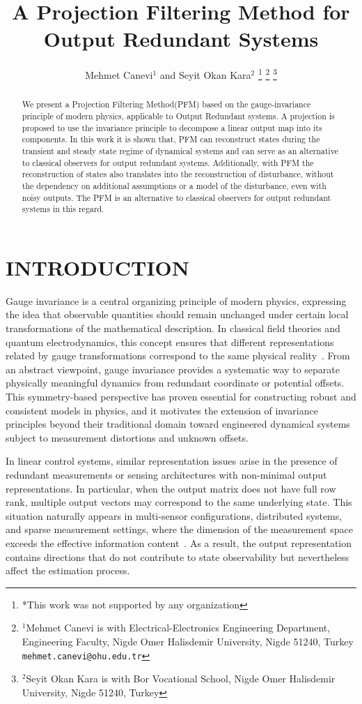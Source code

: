 \documentclass[letterpaper, 10 pt, conference]{ieeeconf}  %
\title{\LARGE \bf
A Projection Filtering Method for Output Redundant Systems
}
\author{Mehmet Canevi$^{1}$ and Seyit Okan Kara$^{2}$%
\thanks{*This work was not supported by any organization}%
\thanks{$^{1}$Mehmet Canevi is with Electrical-Electronics Engineering Department, Engineering Faculty, Nigde Omer Halisdemir University, Nigde 51240, Turkey
        {\tt\small mehmet.canevi@ohu.edu.tr}}%
\thanks{$^{2}$Seyit Okan Kara is with Bor Vocational School, Nigde Omer Halisdemir University, Nigde 51240, Turkey
        }%
}
\begin{document}
\maketitle
\thispagestyle{empty}
\pagestyle{empty}


\begin{abstract}

We present a Projection Filtering Method(PFM) based on the gauge-invariance principle of modern physics, applicable to Output Redundant systems. A projection is proposed to use the invariance principle to decompose a linear output map into its components. In this work it is shown that, PFM can reconstruct states during the transient and steady state regime of dynamical systems and can serve as an alternative to classical observers for output redundant systems. Additionally, with PFM the reconstruction of states also translates into the reconstruction of disturbance, without the dependency on additional assumptions or a model of the disturbance, even with noisy outputs. The PFM is an alternative to classical observers for output redundant systems in this regard.

\end{abstract}


\section{INTRODUCTION}

Gauge invariance is a central organizing principle of modern physics, expressing the idea that observable quantities should remain unchanged under certain local transformations of the mathematical description. In classical field theories and quantum electrodynamics, this concept ensures that different representations related by gauge transformations correspond to the same physical reality~\cite{Peskin1995,YangMills1954}. From an abstract viewpoint, gauge invariance provides a systematic way to separate physically meaningful dynamics from redundant coordinate or potential offsets. This symmetry-based perspective has proven essential for constructing robust and consistent models in physics, and it motivates the extension of invariance principles beyond their traditional domain toward engineered dynamical systems subject to measurement distortions and unknown offsets.

In linear control systems, similar representation issues arise in the presence of redundant measurements or sensing architectures with non-minimal output representations. In particular, when the output matrix does not have full row rank, multiple output vectors may correspond to the same underlying state. This situation naturally appears in multi-sensor configurations, distributed systems, and sparse measurement settings, where the dimension of the measurement space exceeds the effective information content~\cite{Chen1999,Kailath1980}. As a result, the output representation contains directions that do not contribute to state observability but nevertheless affect the estimation process.
\end{document}
